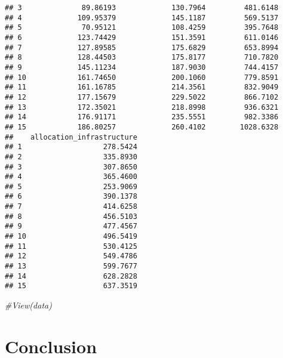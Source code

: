 \documentclass[
]{article}
\newenvironment{Shaded}{\begin{snugshade}}{\end{snugshade}}
\newcommand{\CommentTok}[1]{\textcolor[rgb]{0.56,0.35,0.01}{\textit{#1}}}
\begin{document}
\begin{verbatim}
## 3              89.86193             130.7964         481.6148
## 4             109.95379             145.1187         569.5137
## 5              70.95121             108.4259         395.7648
## 6             123.74429             151.3591         611.0146
## 7             127.89585             175.6829         653.8994
## 8             128.44503             175.8177         710.7820
## 9             145.11234             187.9030         744.4157
## 10            161.74650             200.1060         779.8591
## 11            161.16785             214.3561         832.9049
## 12            177.15679             229.5022         866.7102
## 13            172.35021             218.8998         936.6321
## 14            176.91171             235.5551         982.3386
## 15            186.80257             260.4102        1028.6328
##    allocation_infrastructure
## 1                   278.5424
## 2                   335.8930
## 3                   307.8650
## 4                   365.4600
## 5                   253.9069
## 6                   390.1378
## 7                   414.6258
## 8                   456.5103
## 9                   477.4567
## 10                  496.5419
## 11                  530.4125
## 12                  549.4786
## 13                  599.7677
## 14                  628.2828
## 15                  637.3519
\end{verbatim}

\begin{Shaded}
\begin{Highlighting}[]
\CommentTok{\#View(data)}
\end{Highlighting}
\end{Shaded}

\hypertarget{conclusion}{%
\section{Conclusion}\label{conclusion}}
\end{document}
